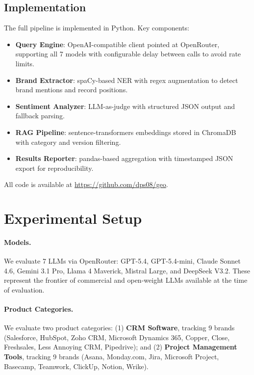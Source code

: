 \documentclass{article}
\begin{document}
\subsection{Implementation}

The full pipeline is implemented in Python. Key components:

\begin{itemize}
  \item \textbf{Query Engine}: OpenAI-compatible client pointed at OpenRouter, supporting all 7 models with configurable delay between calls to avoid rate limits.
  \item \textbf{Brand Extractor}: spaCy-based NER with regex augmentation to detect brand mentions and record positions.
  \item \textbf{Sentiment Analyzer}: LLM-as-judge with structured JSON output and fallback parsing.
  \item \textbf{RAG Pipeline}: sentence-transformers embeddings stored in ChromaDB with category and version filtering.
  \item \textbf{Results Reporter}: pandas-based aggregation with timestamped JSON export for reproducibility.
\end{itemize}

All code is available at \url{https://github.com/dps08/geo}.

\section{Experimental Setup}

\paragraph{Models.}
We evaluate 7 LLMs via OpenRouter: GPT-5.4, GPT-5.4-mini, Claude Sonnet 4.6, Gemini 3.1 Pro, Llama 4 Maverick, Mistral Large, and DeepSeek V3.2. These represent the frontier of commercial and open-weight LLMs available at the time of evaluation.

\paragraph{Product Categories.}
We evaluate two product categories: (1) \textbf{CRM Software}, tracking 9 brands (Salesforce, HubSpot, Zoho CRM, Microsoft Dynamics 365, Copper, Close, Freshsales, Less Annoying CRM, Pipedrive); and (2) \textbf{Project Management Tools}, tracking 9 brands (Asana, Monday.com, Jira, Microsoft Project, Basecamp, Teamwork, ClickUp, Notion, Wrike).
\end{document}

